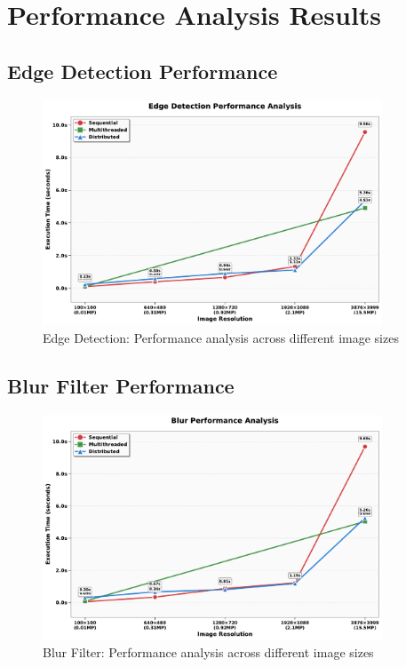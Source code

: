 

\section{Performance Analysis Results}

\subsection{Edge Detection Performance}
\begin{figure}[htbp]
    \centering
    \includegraphics[width=0.9\textwidth]{graphs/edge_detection_performance.pdf}
    \caption{Edge Detection: Performance analysis across different image sizes}
    \label{fig:edge_detection_performance}
\end{figure}

\subsection{Blur Filter Performance}
\begin{figure}[htbp]
    \centering
    \includegraphics[width=0.9\textwidth]{graphs/blur_performance.pdf}
    \caption{Blur Filter: Performance analysis across different image sizes}
    \label{fig:blur_performance}
\end{figure}

